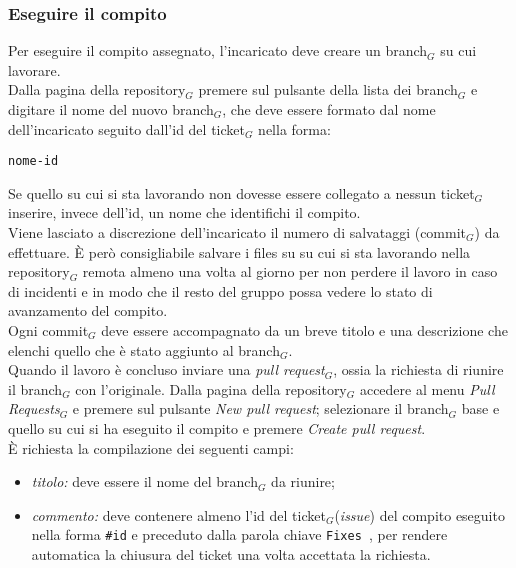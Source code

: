 \subsubsection{Eseguire il compito}
Per eseguire il compito assegnato, l'incaricato deve creare un branch$_G$ su cui lavorare. \\
Dalla pagina della repository$_G$ premere sul pulsante della lista dei branch$_G$ e digitare il nome del nuovo branch$_G$, che deve essere formato dal nome dell'incaricato seguito dall'id del ticket$_G$ nella forma: 
\begin{verbatim}
nome-id
\end{verbatim}
Se quello su cui si sta lavorando non dovesse essere collegato a nessun ticket$_G$ inserire, invece dell'id, un nome che identifichi il compito. \\
Viene lasciato a discrezione dell'incaricato il numero di salvataggi (commit$_G$) da effettuare. È però consigliabile salvare i files su su cui si sta lavorando nella repository$_G$ remota almeno una volta al giorno per non perdere il lavoro in caso di incidenti e in modo che il resto del gruppo possa vedere lo stato di avanzamento del compito. \\
Ogni commit$_G$ deve essere accompagnato da un breve titolo e una descrizione che elenchi quello che è stato aggiunto al branch$_G$. \\
Quando il lavoro è concluso inviare una \textit{pull request}$_G$, ossia la richiesta di riunire il branch$_G$ con l'originale. Dalla pagina della repository$_G$ accedere al menu \textit{Pull Requests}$_G$ e premere sul pulsante \textit{New pull request}; selezionare il branch$_G$ base e quello su cui si ha eseguito il compito e premere \textit{Create pull request}.\\ È richiesta la compilazione dei seguenti campi:
\begin{itemize}
    \item \textit{titolo:} deve essere il nome del branch$_G$ da riunire;
    \item \textit{commento:} deve contenere almeno l'id del ticket$_G$(\textit{issue}) del compito eseguito nella forma \texttt{\#id} e preceduto dalla parola chiave \texttt{Fixes }, per rendere automatica la chiusura del ticket una volta accettata la richiesta. 
\end{itemize}

